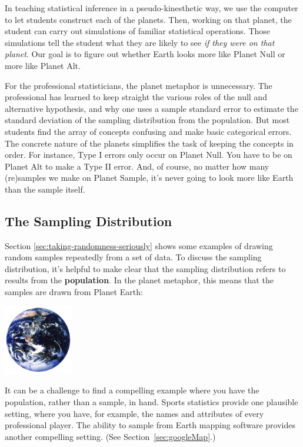In teaching statistical inference in a pseudo-kinesthetic way, we use
the computer to let students construct each of the planets.  
Then, working on that planet, the student can
carry out simulations of familiar statistical operations.   Those
simulations tell the student what they are likely to see \emph{if they were on that planet}.   
Our goal is to figure out whether Earth looks more like Planet Null or more like 
Planet Alt.

For the professional statisticians, the planet metaphor is
unnecessary.  The professional has learned to keep straight the
various roles of the null and alternative hypothesis, and why one uses
a sample standard error to estimate the standard deviation of the
sampling distribution from the population.  But most students find the
array of concepts confusing and make basic categorical errors.  The
concrete nature of the planets simplifies the task of keeping the
concepts in order.  For instance, Type I errors only occur 
on Planet Null.  You have to be on Planet Alt to make a Type II
error.  And, of course, no matter how many (re)samples we make on
Planet Sample, it's never going to look more like Earth than the
sample itself.

\subsection{The Sampling Distribution}

Section \ref{sec:taking-randomness-seriously} shows some examples of
drawing random samples repeatedly from a set of data.  To discuss the
sampling distribution, it's helpful to make clear that the sampling
distribution refers to results from the \textbf{population}.  In the planet
metaphor, this means that the samples are drawn from Planet Earth:

\centerline{\includegraphics[width=1.2in]{images/planet_earth.png}}

It can be a challenge to find a compelling example where you have the
population, rather than a sample, in hand.  Sports statistics provide
one plausible setting, where
you have, for example, the names and attributes of every professional
player.  The ability to sample from Earth mapping software
provides another compelling setting.  (See Section~\ref{sec:googleMap}.)
%

